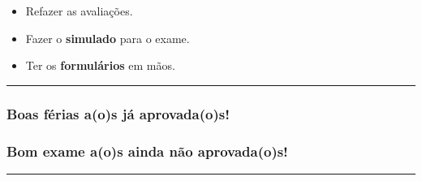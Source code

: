 \documentclass[
]{article}
\begin{document}
\vspace{3.0cm}

\begin{itemize}
\item
  Refazer as avaliações.
\item
  Fazer o \textbf{simulado} para o exame.
\item
  Ter os \textbf{formulários} em mãos.
\end{itemize}

\vspace{1.0cm}

\begin{center}\rule{0.5\linewidth}{0.5pt}\end{center}

\hypertarget{boas-fuxe9rias-aos-juxe1-aprovadaos}{%
\subsubsection{Boas férias a(o)s já
aprovada(o)s!}\label{boas-fuxe9rias-aos-juxe1-aprovadaos}}

\hypertarget{bom-exame-aos-ainda-nuxe3o-aprovadaos}{%
\subsubsection{Bom exame a(o)s ainda não
aprovada(o)s!}\label{bom-exame-aos-ainda-nuxe3o-aprovadaos}}

\begin{center}\rule{0.5\linewidth}{0.5pt}\end{center}
\end{document}
